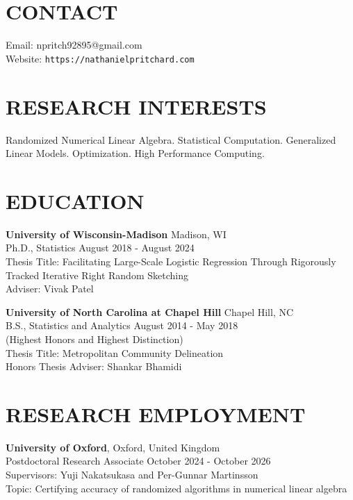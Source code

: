 \documentclass[margin,11pt]{res}
\begin{document}
  
                        
\begin{resume}                        
  
  \section{CONTACT} 
  Email: npritch92895@gmail.com \\
  Website: \texttt{https://nathanielpritchard.com}

  \section{RESEARCH INTERESTS}
  Randomized Numerical Linear Algebra.  Statistical Computation. Generalized Linear Models. Optimization. High Performance Computing.   %
              
\section{EDUCATION}      
                {\bf University of Wisconsin-Madison} \hfill Madison, WI \\
                Ph.D., Statistics \hfill August 2018 - August 2024\\
                		Thesis Title: Facilitating Large-Scale Logistic Regression Through Rigorously Tracked Iterative Right Random Sketching \\
		        Adviser: Vivak Patel	        
		        
                {\bf University of North Carolina at Chapel Hill} \hfill Chapel Hill, NC \\
                B.S., Statistics and Analytics  \hfill August 2014 - May 2018\\
                (Highest Honors and Highest Distinction)\\
                Thesis Title: Metropolitan Community Delineation\\
                Honors Thesis Adviser: Shankar Bhamidi
  
\section{RESEARCH EMPLOYMENT}
		 {\bf University of Oxford}, \hfill Oxford, United Kingdom\\
                Postdoctoral Research Associate \hfill October 2024 - October 2026\\
                Supervisors: Yuji Nakatsukasa and Per-Gunnar Martinsson\\
                Topic: Certifying accuracy of randomized algorithms in numerical linear algebra
                

\end{resume}
\end{document}
